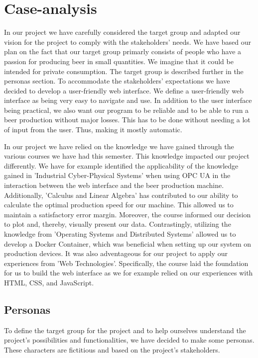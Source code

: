 
\section{Case-analysis}
In our project we have carefully considered the target group and adapted our vision for the project to comply with the stakeholders' needs.
We have based our plan on the fact that our target group primarly consists of people who have a passion for 
producing beer in small quantities. We imagine that it could be intended for private consumption. The target group is described further in the personas section.
To accommodate the stakeholders' expectations we have decided to develop a user-friendly web interface. We define a user-friendly web interface as being very easy to navigate and use.
In addition to the user interface being practical, we also want our program to be reliable and to be able to run a 
beer production without major losses. This has to be done without needing a lot of input from the user. Thus, making it mostly automatic.

In our project we have relied on the knowledge we have gained through the various courses we have had this semester.
This knowledge impacted our project differently. We have for example identified the applicability of the knowledge gained in 'Industrial Cyber-Physical Systems' when using OPC UA in the 
interaction between the web interface and the beer production machine. Additionally, 'Calculus and Linear Algebra' has contributed to our ability to calculate the optimal production speed for our machine.
This allowed us to maintain a satisfactory error margin. Moreover, the course informed our decision to plot and, thereby, visually present our data.
Contrastingly, utilizing the knowledge from 'Operating Systems and Distributed Systems' allowed us to develop a Docker Container, which was beneficial when setting up our system on production devices.
It was also adventageous for our project to apply our experiences from 'Web Technologies'. Specifically, the course laid the foundation for us to build the web interface as we for example relied on 
our experiences with HTML, CSS, and JavaScript.



\subsection{Personas}
To define the target group for the project and to help ourselves understand the project's possibilities and functionalities, 
we have decided to make some personas. These characters are fictitious and based on the project's stakeholders. \newline

